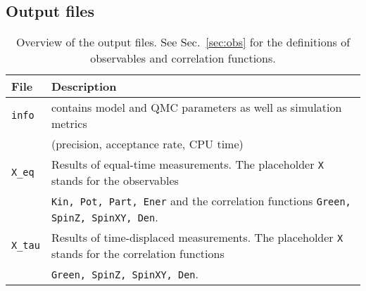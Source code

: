 \subsection{Output files} \label{sec:output}
%
\begin{table}[h]
   \begin{tabular}{l l}
   File & Description \\\hline
   \texttt{info} & contains model and QMC parameters as well as simulation metrics\\
   & (precision, acceptance rate, CPU time)\\
   \texttt{X\_eq} & Results of equal-time measurements.
   The placeholder \texttt{X} stands for the observables \\
   &    \texttt{Kin, Pot, Part, Ener} and the correlation functions \texttt{Green, SpinZ, SpinXY, Den}. \\
   \texttt{X\_tau} & Results of time-displaced measurements.
   The placeholder \texttt{X} stands for the correlation functions \\
   &    \texttt{Green, SpinZ, SpinXY, Den}. \\   
   \end{tabular}
   \caption{Overview of the output files. 
  See Sec.~\ref{sec:obs} for the definitions of observables and correlation functions. \label{table:files}}
\end{table}
%
